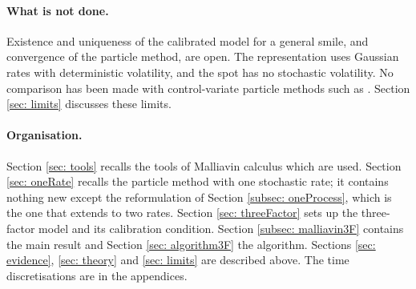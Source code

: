 \paragraph{What is not done.} Existence and uniqueness of the calibrated model for a general smile, and convergence of the particle method, are open. The representation uses Gaussian rates with deterministic volatility, and the spot has no stochastic volatility. No comparison has been made with control-variate particle methods such as \cite{cozma}. Section \ref{sec: limits} discusses these limits.

\paragraph{Organisation.} Section \ref{sec: tools} recalls the tools of Malliavin calculus which are used. Section \ref{sec: oneRate} recalls the particle method with one stochastic rate; it contains nothing new except the reformulation of Section \ref{subsec: oneProcess}, which is the one that extends to two rates. Section \ref{sec: threeFactor} sets up the three-factor model and its calibration condition. Section \ref{subsec: malliavin3F} contains the main result and Section \ref{sec: algorithm3F} the algorithm. Sections \ref{sec: evidence}, \ref{sec: theory} and \ref{sec: limits} are described above. The time discretisations are in the appendices.
